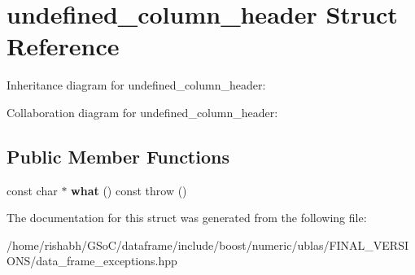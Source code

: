\hypertarget{structundefined__column__header}{}\section{undefined\+\_\+column\+\_\+header Struct Reference}
\label{structundefined__column__header}


Inheritance diagram for undefined\+\_\+column\+\_\+header\+:


Collaboration diagram for undefined\+\_\+column\+\_\+header\+:
\subsection*{Public Member Functions}
\begin{DoxyCompactItemize}
\item 
const char $\ast$ {\bfseries what} () const   throw ()\hypertarget{structundefined__column__header_a744725ce454e88369918e8f1ecf85e7c}{}\label{structundefined__column__header_a744725ce454e88369918e8f1ecf85e7c}

\end{DoxyCompactItemize}


The documentation for this struct was generated from the following file\+:\begin{DoxyCompactItemize}
\item 
/home/rishabh/\+G\+So\+C/dataframe/include/boost/numeric/ublas/\+F\+I\+N\+A\+L\+\_\+\+V\+E\+R\+S\+I\+O\+N\+S/data\+\_\+frame\+\_\+exceptions.\+hpp\end{DoxyCompactItemize}
